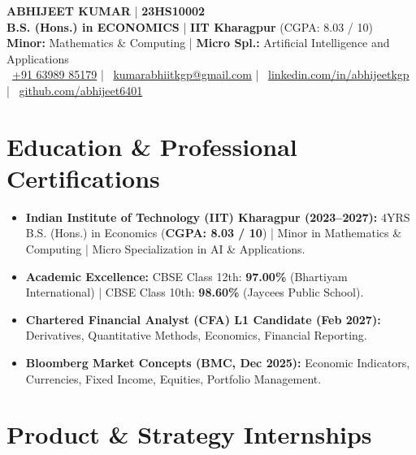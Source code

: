 \documentclass[10pt, a4paper]{article}
\begin{document}
\begin{center}
  {\LARGE \textbf{ABHIJEET KUMAR}} \quad | \quad \textbf{23HS10002} \\[3pt]
  \textbf{B.S. (Hons.) in ECONOMICS} \quad | \quad \textbf{IIT Kharagpur} (CGPA: 8.03 / 10) \\[2pt]
  \small \textbf{Minor:} Mathematics \& Computing \quad | \quad \textbf{Micro Spl.:} Artificial Intelligence and Applications \\[3pt]
  \small
  \faPhone\ \href{tel:+916398985179}{+91 63989 85179} \quad | \quad
  \faEnvelope\ \href{mailto:kumarabhiitkgp@gmail.com}{kumarabhiitkgp@gmail.com} \quad | \quad
  \faLinkedin\ \href{https://linkedin.com/in/abhijeetkgp}{linkedin.com/in/abhijeetkgp} \quad | \quad
  \faGithub\ \href{https://github.com/abhijeet6401}{github.com/abhijeet6401}
\end{center}

\vspace{-4pt}

\section{Education \& Professional Certifications}
\begin{itemize}[leftmargin=1.2em, itemsep=0.5pt, parsep=0pt, topsep=1pt]
  \small
  \item \textbf{Indian Institute of Technology (IIT) Kharagpur (2023--2027):} 4YRS B.S. (Hons.) in Economics (\textbf{CGPA: 8.03 / 10}) | Minor in Mathematics \& Computing | Micro Specialization in AI \& Applications.
  \item \textbf{Academic Excellence:} CBSE Class 12th: \textbf{97.00\%} (Bhartiyam International) | CBSE Class 10th: \textbf{98.60\%} (Jaycees Public School).
  \item \textbf{Chartered Financial Analyst (CFA) L1 Candidate (Feb 2027):} Derivatives, Quantitative Methods, Economics, Financial Reporting.
  \item \textbf{Bloomberg Market Concepts (BMC, Dec 2025):} Economic Indicators, Currencies, Fixed Income, Equities, Portfolio Management.
\end{itemize}

\vspace{-2pt}

\section{Product \& Strategy Internships}
\end{document}
